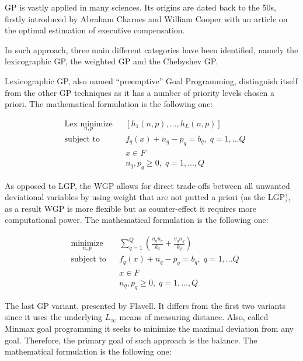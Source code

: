 \documentclass{article}
\begin{document}
GP is vastly applied in many sciences\cite{tamiz_goal_1997}. Its origins are dated back to the 50s, firstly introduced by Abraham Charnes and William Cooper\cite{charnes_optimal_1955} with an article on the optimal estimation of executive compensation.

In such approach, three main different categories have been identified, namely the lexicographic GP, the weighted GP and the Chebyshev GP.

Lexicographic GP, also named “preemptive” Goal Programming, distinguish itself from the other GP techniques as it has a number of priority levels chosen a priori. The mathematical formulation is the following one:

\begin{equation*}
\begin{aligned}
& \underset{n,p}{\text{Lex minimize}}
& & [h_1(n,p),...,h_L(n,p)] \\
& \text{subject to}
& & f_q(x)+n_q-p_q=b_q, \; q=1,...Q \\
& & & x\in F \\
& & & n_q,p_q\geq 0, \; q=1,...,Q 
\end{aligned}
\end{equation*}

As opposed to LGP, the WGP allows for direct trade-offs between all unwanted deviational variables by using weight that are not putted a priori (as the LGP), as a result WGP is more flexible but as counter-effect it requires more computational power. The mathematical formulation is the following one:

\begin{equation*}
\begin{aligned}
& \underset{n,p}{\text{minimize}}
& & \sum_{q=1}^{Q}(\frac{u_q n_q}{k_q}+\frac{v_q n_q}{k_q}) \\
& \text{subject to}
& & f_q(x)+n_q-p_q=b_q, \; q=1,...Q \\
& & & x\in F \\
& & & n_q,p_q\geq 0, \; q=1,...,Q 
\end{aligned}
\end{equation*}

The last GP variant, presented by Flavell. It differs from the first two variants since it uses the underlying $ L_\infty $ means of measuring distance. Also, called Minmax goal programming it seeks to minimize the maximal deviation from any goal. Therefore, the primary goal of such approach is the balance. The mathematical formulation is the following one:
\end{document}
